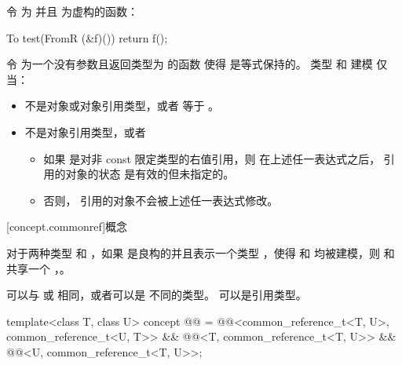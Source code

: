 \begin{itemdescr}
\pnum
令  为  并且
 为虚构的函数：
\begin{codeblock}
To test(FromR (&f)()) {
  return f();
}
\end{codeblock}
令  为一个没有参数且返回类型为  的函数
使得  是等式保持的。
类型  和  建模 
仅当：

\begin{itemize}
\item
{} 不是对象或对象引用类型，或者
 等于 。

\item
{} 不是对象引用类型，或者

\begin{itemize}
\item
如果  是对非 const 限定类型的右值引用，则
在上述任一表达式之后， 引用的对象的状态
是有效的但未指定的。

\item
否则， 引用的对象不会被上述任一表达式修改。
\end{itemize}
\end{itemize}
\end{itemdescr}


[concept.commonref]{概念 }

\pnum
对于两种类型  和 ，如果 
是良构的并且表示一个类型 ，使得
和
均被建模，则  和  共享一个
，。
\begin{note}
 可以与  或  相同，或者可以是
不同的类型。 可以是引用类型。
\end{note}

\begin{itemdecl}
template<class T, class U>
  concept @@ =
    @@<common_reference_t<T, U>, common_reference_t<U, T>> &&
    @@<T, common_reference_t<T, U>> &&
    @@<U, common_reference_t<T, U>>;
\end{itemdecl}


